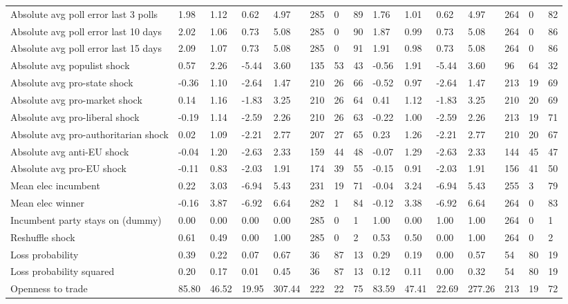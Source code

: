 \begin{longtable}{lllllllllllllll}
\addlinespace
Absolute avg poll error last 3 polls & 1.98 & 1.12 & 0.62 & 4.97 & 285 & 0 & 89 & 1.76 & 1.01 & 0.62 & 4.97 & 264 & 0 & 82\\
Absolute avg poll error last 10 days & 2.02 & 1.06 & 0.73 & 5.08 & 285 & 0 & 90 & 1.87 & 0.99 & 0.73 & 5.08 & 264 & 0 & 86\\
Absolute avg poll error last 15 days & 2.09 & 1.07 & 0.73 & 5.08 & 285 & 0 & 91 & 1.91 & 0.98 & 0.73 & 5.08 & 264 & 0 & 86\\
Absolute avg populist shock & 0.57 & 2.26 & -5.44 & 3.60 & 135 & 53 & 43 & -0.56 & 1.91 & -5.44 & 3.60 & 96 & 64 & 32\\
Absolute avg pro-state shock & -0.36 & 1.10 & -2.64 & 1.47 & 210 & 26 & 66 & -0.52 & 0.97 & -2.64 & 1.47 & 213 & 19 & 69\\
\addlinespace
Absolute avg pro-market shock & 0.14 & 1.16 & -1.83 & 3.25 & 210 & 26 & 64 & 0.41 & 1.12 & -1.83 & 3.25 & 210 & 20 & 69\\
Absolute avg pro-liberal shock & -0.19 & 1.14 & -2.59 & 2.26 & 210 & 26 & 63 & -0.22 & 1.00 & -2.59 & 2.26 & 213 & 19 & 71\\
Absolute avg pro-authoritarian shock & 0.02 & 1.09 & -2.21 & 2.77 & 207 & 27 & 65 & 0.23 & 1.26 & -2.21 & 2.77 & 210 & 20 & 67\\
Absolute avg anti-EU shock & -0.04 & 1.20 & -2.63 & 2.33 & 159 & 44 & 48 & -0.07 & 1.29 & -2.63 & 2.33 & 144 & 45 & 47\\
Absolute avg pro-EU shock & -0.11 & 0.83 & -2.03 & 1.91 & 174 & 39 & 55 & -0.15 & 0.91 & -2.03 & 1.91 & 156 & 41 & 50\\
\addlinespace
Mean elec incumbent & 0.22 & 3.03 & -6.94 & 5.43 & 231 & 19 & 71 & -0.04 & 3.24 & -6.94 & 5.43 & 255 & 3 & 79\\
Mean elec winner & -0.16 & 3.87 & -6.92 & 6.64 & 282 & 1 & 84 & -0.12 & 3.38 & -6.92 & 6.64 & 264 & 0 & 83\\
Incumbent party stays on (dummy) & 0.00 & 0.00 & 0.00 & 0.00 & 285 & 0 & 1 & 1.00 & 0.00 & 1.00 & 1.00 & 264 & 0 & 1\\
Reshuffle shock & 0.61 & 0.49 & 0.00 & 1.00 & 285 & 0 & 2 & 0.53 & 0.50 & 0.00 & 1.00 & 264 & 0 & 2\\
Loss probability & 0.39 & 0.22 & 0.07 & 0.67 & 36 & 87 & 13 & 0.29 & 0.19 & 0.00 & 0.57 & 54 & 80 & 19\\
\addlinespace
Loss probability squared & 0.20 & 0.17 & 0.01 & 0.45 & 36 & 87 & 13 & 0.12 & 0.11 & 0.00 & 0.32 & 54 & 80 & 19\\
Openness to trade & 85.80 & 46.52 & 19.95 & 307.44 & 222 & 22 & 75 & 83.59 & 47.41 & 22.69 & 277.26 & 213 & 19 & 72\\

\end{longtable}
